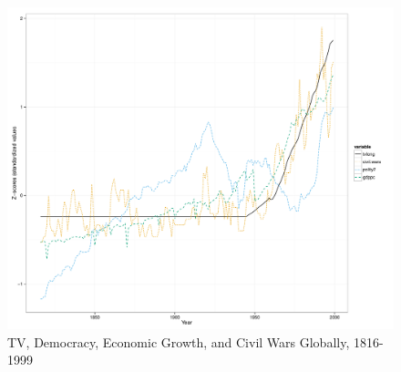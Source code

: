 \documentclass[11pt,article,oneside]{memoir}
\makeatletter
\def\maxwidth{\ifdim\Gin@nat@width>\linewidth\linewidth
\else\Gin@nat@width\fi}
\let\Oldincludegraphics\includegraphics
\renewcommand{\includegraphics}[1]{\Oldincludegraphics[width=\maxwidth]{#1}}
\makeatother
\begin{document}
\begin{figure}[htbp]
\centering
\includegraphics{figure/longrunplot.pdf}
\caption{TV, Democracy, Economic Growth, and Civil Wars Globally,
1816-1999}
\end{figure}
\end{document}
